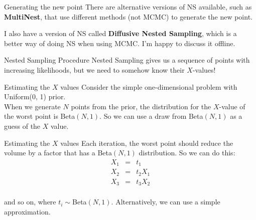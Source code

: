 \documentclass{beamer}
\begin{document}
\begin{frame}[t]{Generating the new point}
There are alternative versions of NS available, such as {\bf MultiNest}, that
use different methods (not MCMC) to generate the new point.\\
\vspace{20pt}

I also have a version of NS called {\bf Diffusive Nested Sampling}, which is
a better way of doing NS when using MCMC. I'm happy to discuss it offline.
\end{frame}


\begin{frame}[t]{Nested Sampling Procedure}
Nested Sampling gives us a sequence of points with increasing likelihoods,
but we need to somehow know their $X$-values!
\end{frame}

\begin{frame}[t]{Estimating the $X$ values}
Consider the simple one-dimensional problem with Uniform(0, 1) prior.\\

\vspace{20pt}
When we generate $N$ points from the prior, the distribution for the $X$-value
of the worst point is Beta$(N, 1)$. So we can use a draw from Beta$(N,1)$ as
a guess of the $X$ value.
\end{frame}

\begin{frame}[t]{Estimating the $X$ values}
Each iteration, the worst point should reduce the volume by a factor that has
a Beta$(N, 1)$ distribution. So we can do this:
\begin{eqnarray*}
X_1 &=& t_1\\
X_2 &=& t_2X_1\\
X_3 &=& t_3X_2\\
\end{eqnarray*}

and so on, where $t_i \sim $Beta$(N,1)$. Alternatively, we can use a simple
approximation.
\end{frame}
\end{document}
